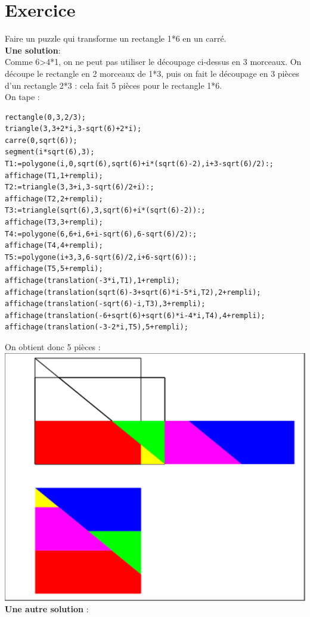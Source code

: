 \documentclass[a4paper,11pt]{book}
\begin{document}
\section{Exercice}
Faire un puzzle qui transforme un rectangle 1*6 en un carr\'e.\\
{\bf Une solution}: \\
Comme 6>4*1, on ne peut pas utiliser le d\'ecoupage 
 ci-dessus en 3 morceaux.
On d\'ecoupe le rectangle en 2 morceaux de 1*3, puis on fait le d\'ecoupage 
en 3 pi\`eces d'un rectangle 2*3 : cela fait 5 pi\`eces pour le rectangle 1*6.\\
 On tape :
\begin{verbatim}
rectangle(0,3,2/3);
triangle(3,3+2*i,3-sqrt(6)+2*i);
carre(0,sqrt(6));
segment(i*sqrt(6),3);
T1:=polygone(i,0,sqrt(6),sqrt(6)+i*(sqrt(6)-2),i+3-sqrt(6)/2):;
affichage(T1,1+rempli);
T2:=triangle(3,3+i,3-sqrt(6)/2+i):;
affichage(T2,2+rempli);
T3:=triangle(sqrt(6),3,sqrt(6)+i*(sqrt(6)-2)):;
affichage(T3,3+rempli);
T4:=polygone(6,6+i,6+i-sqrt(6),6-sqrt(6)/2):;
affichage(T4,4+rempli);
T5:=polygone(i+3,3,6-sqrt(6)/2,i+6-sqrt(6)):;
affichage(T5,5+rempli);
affichage(translation(-3*i,T1),1+rempli);
affichage(translation(sqrt(6)-3+sqrt(6)*i-5*i,T2),2+rempli);
affichage(translation(-sqrt(6)-i,T3),3+rempli);
affichage(translation(-6+sqrt(6)+sqrt(6)*i-4*i,T4),4+rempli);
affichage(translation(-3-2*i,T5),5+rempli);
\end{verbatim}
On obtient donc 5 pi\`eces :\\
\includegraphics[width=\textwidth]{carresqrt61}
{\bf Une autre solution} : \\
\end{document}
